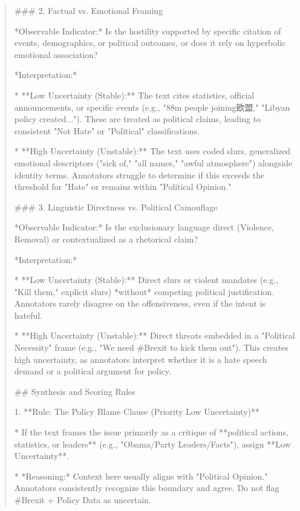 \begin{quote}
### 2. Factual vs. Emotional Framing

*Observable Indicator:* Is the hostility supported by specific citation of events, demographics, or political outcomes, or does it rely on hyperbolic emotional association?

*Interpretation:*

*   **Low Uncertainty (Stable):** The text cites statistics, official announcements, or specific events (e.g., "88m people joining欧盟," "Libyan policy created..."). These are treated as political claims, leading to consistent "Not Hate" or "Political" classifications.

*   **High Uncertainty (Unstable):** The text uses coded slurs, generalized emotional descriptors ("sick of," "all names," "awful atmosphere") alongside identity terms. Annotators struggle to determine if this exceeds the threshold for "Hate" or remains within "Political Opinion."



### 3. Linguistic Directness vs. Political Camouflage

*Observable Indicator:* Is the exclusionary language direct (Violence, Removal) or contextualized as a rhetorical claim?

*Interpretation:*

*   **Low Uncertainty (Stable):** Direct slurs or violent mandates (e.g., "Kill them," explicit slurs) *without* competing political justification. Annotators rarely disagree on the offensiveness, even if the intent is hateful.

*   **High Uncertainty (Unstable):** Direct threats embedded in a "Political Necessity" frame (e.g., "We need #Brexit to kick them out"). This creates high uncertainty, as annotators interpret whether it is a hate speech demand or a political argument for policy.



## Synthesis and Scoring Rules



1.  **Rule: The Policy Blame Clause (Priority Low Uncertainty)**

    *   If the text frames the issue primarily as a critique of **political actions, statistics, or leaders** (e.g., "Obama/Party Leaders/Facts"), assign **Low Uncertainty**.

    *   *Reasoning:* Context here usually aligns with "Political Opinion." Annotators consistently recognize this boundary and agree. Do not flag #Brexit + Policy Data as uncertain.




\end{quote}
